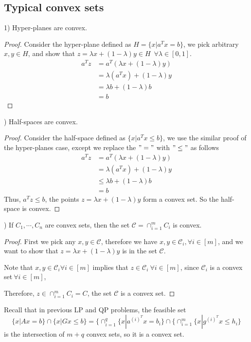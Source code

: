 \subsection{Typical convex sets}

1) Hyper-planes are convex. 
\begin{proof}
Consider the hyper-plane defined as $H = \{x| a^Tx = b \}$, we pick arbitrary $x,y \in H$, and show that $z =\lambda x + (1-\lambda)y \in H$\ $\forall \lambda \in [0,1]$.
\begin{align*}
a^Tz &= a^T(\lambda x + (1-\lambda)y)\\
&= \lambda(a^Tx) + (1-\lambda)y\\
&= \lambda b + (1-\lambda)b\\
&= b
\end{align*}	
\end{proof}
	
) Half-spaces are convex.
\begin{proof}
Consider the half-space defined as $\{x| a^Tx \leq b \}$, we use the similar proof of the hyper-planes case, except we replace the $"="$ with $"\leq"$ as follows
\begin{align*}
a^Tz &= a^T(\lambda x + (1-\lambda)y)\\
&= \lambda(a^Tx) + (1-\lambda)y\\
&\leq \lambda b + (1-\lambda)b\\
&= b
\end{align*}
Thus, $a^Tz \leq b$, the points $z = \lambda x + (1-\lambda)y$ form a convex set. So the half-space is convex.
\end{proof}

) If $C_1, \cdots, C_n$ are convex sets, then the set $\mathcal{C} = \cap^m_{i=1} C_i$ is convex.
\begin{proof}
First we pick any $x,y\in \mathcal{C}$, therefore we have $x,y\in \mathcal{C}_i,\forall i\in [m]$, and we want to show that $z = \lambda x + (1 - \lambda)y$ is in the set $\mathcal{C}$.
		
Note that $x,y \in \mathcal{C}_i \forall i\in[m]$ implies that $z\in \mathcal{C}_i\ \forall i\in [m]$, since $\mathcal{C}_i$ is a convex set$\ \forall i\in [m]$,
		
Therefore,  $z\in \cap^m_{i=1}C_i = C$, the set $\mathcal{C}$ is a convex set.		
\end{proof}

\begin{example}

Recall that in previous LP and QP problems, the feasible set 
$$\{x|Ax = b \}\cap \{x|Gx\leq b \} = \{\cap^q_{i=1}\{x|a^{(i)^T}x = b_i  \}\cap \{\cap^m_{i=1}\{x|g^{(i)^T}x \leq h_i \}$$
is the intersection of $m+q$ convex sets, so it is a convex set.
\end{example}

